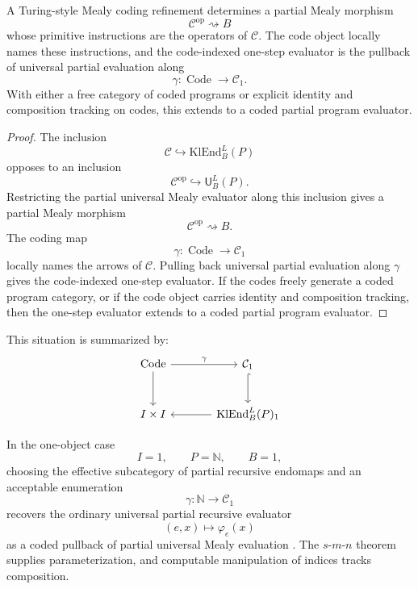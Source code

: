 \begin{proposition}
\label{prop:coded-partial-evaluation}
A Turing-style Mealy coding refinement determines a partial Mealy morphism
\[
        \mathcal C^{\operatorname{op}}\rightsquigarrow B
\]
whose primitive instructions are the operators of \(\mathcal C\).  The code object locally names
these instructions, and the code-indexed one-step evaluator is the pullback of universal partial
evaluation along
\[
        \gamma:\operatorname{Code}\to\mathcal C_1.
\]
With either a free category of coded programs or explicit identity and composition tracking on
codes, this extends to a coded partial program evaluator.
\end{proposition}

\begin{proof}
The inclusion
\[
        \mathcal C\hookrightarrow \mathrm{KlEnd}^L_B(P)
\]
opposes to an inclusion
\[
        \mathcal C^{\operatorname{op}}\hookrightarrow \mathsf U^L_B(P).
\]
Restricting the partial universal Mealy evaluator along this inclusion gives a partial Mealy
morphism
\[
        \mathcal C^{\operatorname{op}}\rightsquigarrow B.
\]
The coding map
\[
        \gamma:\operatorname{Code}\to\mathcal C_1
\]
locally names the arrows of \(\mathcal C\).  Pulling back universal partial evaluation along
\(\gamma\) gives the code-indexed one-step evaluator.  If the codes freely generate a coded program
category, or if the code object carries identity and composition tracking, then the one-step
evaluator extends to a coded partial program evaluator.
\end{proof}

This situation is summarized by:
\[
\begin{tikzcd}[column sep=large,row sep=large]
\operatorname{Code}
\ar[r,"\gamma"]
\ar[d]
&
\mathcal C_1
\ar[d,hook]
\\
I\times I
&
\mathrm{KlEnd}^L_B(P)_1
\ar[l]
\end{tikzcd}
\]

In the one-object case
\[
        I=1,
        \qquad
        P=\mathbb N,
        \qquad
        B=1,
\]
choosing the effective subcategory of partial recursive endomaps and an acceptable enumeration
\[
        \gamma:\mathbb N\longrightarrow \mathcal C_1
\]
recovers the ordinary universal partial recursive evaluator
\[
        (e,x)\longmapsto \varphi_e(x)
\]
as a coded pullback of partial universal Mealy evaluation \cite{Kleene1952,Rogers1967}.  The
\(s\)-\(m\)-\(n\) theorem supplies parameterization, and computable manipulation of indices tracks
composition.

